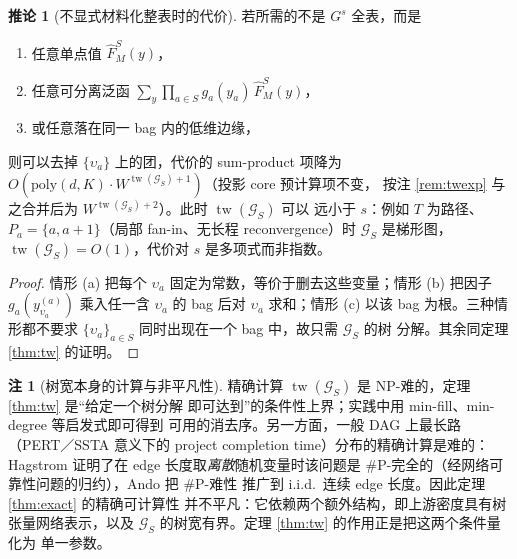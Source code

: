 \documentclass[a4paper,11pt]{article}
\theoremstyle{definition}
\newtheorem{corollary}{推论}
\newtheorem{remark}{注}
\newcommand{\1}{\mathbf 1}
\newcommand{\tw}{\operatorname{tw}}
\newcommand{\Gcal}{\mathcal G}
\begin{document}
\begin{corollary}[不显式材料化整表时的代价]
\label{cor:twnoclique}
若所需的不是 $G^{s}$ 全表，而是
\begin{enumerate}[label=(\alph*)]
\item 任意单点值 $\widehat F^{S}_{M}(y)$，
\item 任意可分离泛函
$\sum_{y}\prod_{a\in S}g_a(y_a)\,\widehat F^{S}_{M}(y)$，
\item 或任意落在同一 bag 内的低维边缘，
\end{enumerate}
则可以去掉 $\{\upsilon_a\}$ 上的团，代价的 sum-product 项降为
$O(\mathrm{poly}(d,K)\cdot W^{\tw(\Gcal_S)+1})$（投影 core 预计算项不变，
按注 \ref{rem:twexp} 与之合并后为 $W^{\tw(\Gcal_S)+2}$）。此时
$\tw(\Gcal_S)$ 可以
远小于 $s$：例如 $T$ 为路径、$P_a=\{a,a+1\}$（局部 fan-in、无长程
reconvergence）时 $\Gcal_S$ 是梯形图，$\tw(\Gcal_S)=O(1)$，代价对 $s$
是多项式而非指数。
\end{corollary}

\begin{proof}
情形 (a) 把每个 $\upsilon_a$ 固定为常数，等价于删去这些变量；情形 (b)
把因子 $g_a(y^{(a)}_{\upsilon_a})$ 乘入任一含 $\upsilon_a$ 的 bag 后对
$\upsilon_a$ 求和；情形 (c) 以该 bag 为根。三种情形都不要求
$\{\upsilon_a\}_{a\in S}$ 同时出现在一个 bag 中，故只需 $\Gcal_S$ 的树
分解。其余同定理 \ref{thm:tw} 的证明。
\end{proof}

\begin{remark}[树宽本身的计算与非平凡性]
\label{rem:twhard}
精确计算 $\tw(\Gcal_S)$ 是 NP-难的，定理 \ref{thm:tw} 是“给定一个树分解
即可达到”的条件性上界；实践中用 min-fill、min-degree 等启发式即可得到
可用的消去序。另一方面，一般 DAG 上最长路（PERT／SSTA 意义下的
project completion time）分布的精确计算是难的：Hagstrom
\cite{Hagstrom1988} 证明了在 edge 长度取\emph{离散}随机变量时该问题是
\#P-完全的（经网络可靠性问题的归约），Ando \cite{Ando2026} 把 \#P-难性
推广到 i.i.d.\ 连续 edge 长度。因此定理 \ref{thm:exact} 的精确可计算性
并不平凡：它依赖两个额外结构，即上游密度具有树张量网络表示，以及
$\Gcal_S$ 的树宽有界。定理 \ref{thm:tw} 的作用正是把这两个条件量化为
单一参数。
\end{remark}
\end{document}
